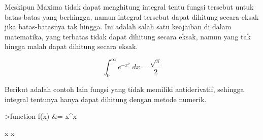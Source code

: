 \documentclass[12pt,Times new roman,letterpaper]{book}
\begin{document}
\begin{eulernootebook}
\begin{eulercomment}
\begin{eulercomment}
\begin{eulernootebook}
\begin{eulercomment}
\begin{eulercomment}
\begin{eulercomment}
\begin{eulercomment}
\begin{eulercomment}
\begin{eulercomment}
\begin{eulernotebook}
\begin{eulercomment}
\begin{eulercomment}
\begin{eulercomment}
\begin{eulercomment}
\begin{eulercomment}
\begin{eulercomment}
\begin{eulercomment}
\begin{eulercomment}
\begin{eulercomment}
Meskipun Maxima tidak dapat menghitung integral tentu fungsi tersebut
untuk batas-batas yang berhingga, namun integral tersebut dapat
dihitung secara eksak jika batas-batasnya tak hingga. Ini adalah salah
satu keajaiban di dalam matematika, yang terbatas tidak dapat dihitung
secara eksak, namun yang tak hingga malah dapat dihitung secara eksak.
\end{eulercomment}
\begin{eulerformula}
\[
\int_{0}^{\infty }{e^ {- x^2 }\;dx}=\frac{\sqrt{\pi}}{2}
\]
\end{eulerformula}
\begin{eulercomment}
Berikut adalah contoh lain fungsi yang tidak memiliki antiderivatif,
sehingga integral tentunya hanya dapat dihitung dengan metode numerik.
\end{eulercomment}
\begin{eulerprompt}
>function f(x) &= x^x
\end{eulerprompt}
\begin{euleroutput}
  
                                     x
                                    x
  

\end{euleroutput}
\end{eulercomment}
\end{eulercomment}
\end{eulercomment}
\end{eulercomment}
\end{eulercomment}
\end{eulercomment}
\end{eulercomment}
\end{eulercomment}
\end{eulernotebook}
\end{eulercomment}
\end{eulercomment}
\end{eulercomment}
\end{eulercomment}
\end{eulercomment}
\end{eulercomment}
\end{eulernootebook}
\end{eulercomment}
\end{eulercomment}
\end{eulernootebook}
\end{document}
